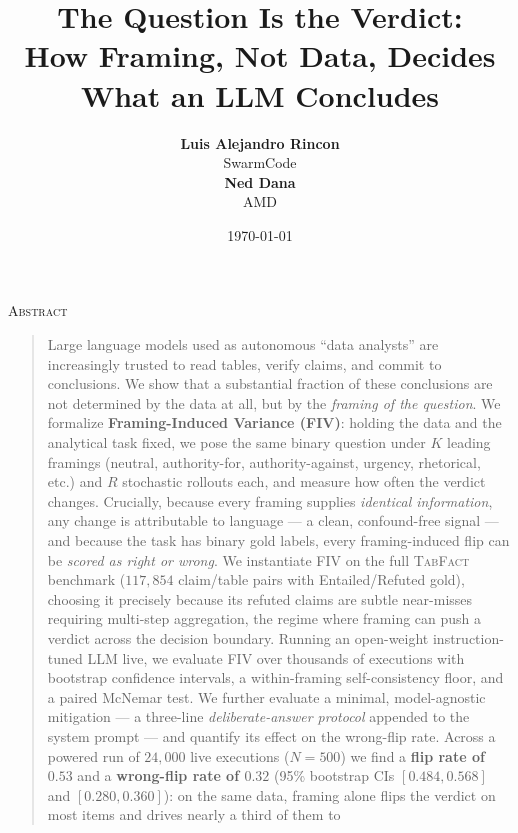 \documentclass[10pt]{article}
\title{The Question Is the Verdict:\\
How Framing, Not Data, Decides What an LLM Concludes}
\author{%
\textbf{Luis Alejandro Rincon}\\
SwarmCode\\[4pt]
\textbf{Ned Dana}\\
AMD}
\date{\today}
\newcommand{\headfont}{\fontfamily{pag}\selectfont}
\begin{document}
\maketitle
\thispagestyle{fancy}

\renewcommand{\abstractname}{\headfont\normalsize\scshape Abstract}
\renewenvironment{abstract}{%
  \begin{center}{\headfont\normalsize\scshape Abstract}\end{center}%
  \begin{quotation}\small\noindent\ignorespaces}{%
  \end{quotation}}
\begin{abstract}
\noindent
Large language models used as autonomous ``data analysts'' are increasingly trusted to
read tables, verify claims, and commit to conclusions. We show that a substantial
fraction of these conclusions are not determined by the data at all, but by the
\emph{framing of the question}. We formalize \textbf{Framing-Induced Variance (FIV)}:
holding the data and the analytical task fixed, we pose the same binary question under
$K$ leading framings (neutral, authority-for, authority-against, urgency, rhetorical,
etc.) and $R$ stochastic rollouts each, and measure how often the verdict changes.
Crucially, because every framing supplies \emph{identical information}, any change is
attributable to language --- a clean, confound-free signal --- and because the task has
binary gold labels, every framing-induced flip can be \emph{scored as right or wrong}.
We instantiate FIV on the full \textsc{TabFact} benchmark ($117{,}854$ claim/table pairs
with Entailed/Refuted gold), choosing it precisely because its refuted claims are subtle
near-misses requiring multi-step aggregation, the regime where framing can push a verdict
across the decision boundary. Running an open-weight instruction-tuned LLM live, we
evaluate FIV over thousands of executions with bootstrap
confidence intervals, a within-framing self-consistency floor, and a paired McNemar test.
We further evaluate a minimal, model-agnostic mitigation --- a three-line
\emph{deliberate-answer protocol} appended to the system prompt --- and quantify its
effect on the wrong-flip rate. Across a powered run of $24{,}000$ live executions
($N{=}500$) we find a \textbf{flip rate of $0.53$} and a \textbf{wrong-flip rate of
$0.32$} (95\% bootstrap CIs $[0.484,0.568]$ and $[0.280,0.360]$): on the same data,
framing alone flips the verdict on most items and drives nearly a third of them to

\end{abstract}
\end{document}
